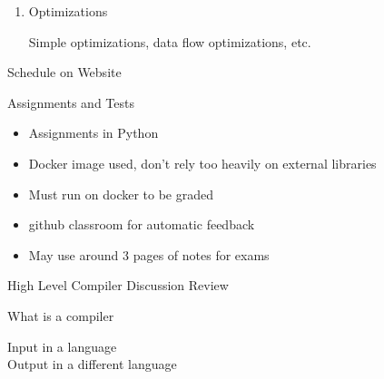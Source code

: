 \documentclass{report}
\begin{document}
\begin{description}
\begin{enumerate}
            \item Optimizations
                \begin{mdframed}
                    Simple optimizations, data flow optimizations,
                    etc.
                \end{mdframed}
        \end{enumerate}
        \begin{mdframed}
            Schedule on Website
        \end{mdframed}
    \item Assignments and Tests
        \begin{itemize}
            \item Assignments in Python
            \item Docker image used, don't rely too heavily on external libraries
            \item Must run on docker to be graded
            \item github classroom for automatic feedback
            \item May use around 3 pages of notes for exams
        \end{itemize}
\end{description}

\large{High Level Compiler Discussion Review}
\begin{description}
    \item What is a compiler
        \begin{mdframed}
            Input in a language\\
            Output in a different language
        \end{mdframed}
\end{description}
\end{document}
